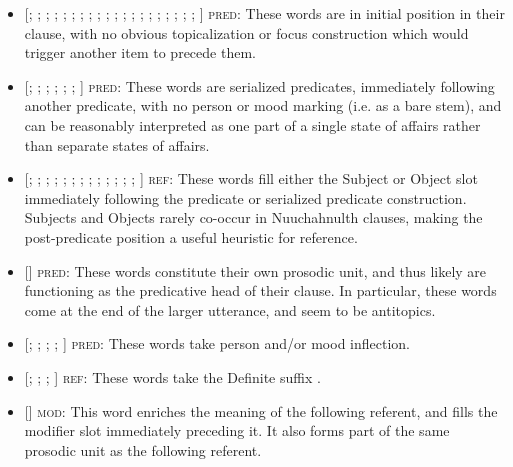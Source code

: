 \begin{itemize}
  \singlespacing
  \item {[; ; ; ; ; ; ; ; ; ; ; ; ; ; ; ; ; ; ; ; ]} \textsc{pred:} These words are in initial position in their clause, with no obvious topicalization or focus construction which would trigger another item to precede them.
  \item {[; ; ; ; ; ; ]} \textsc{pred:} These words are serialized predicates, immediately following another predicate, with no person or mood marking (i.e. as a bare stem), and can be reasonably interpreted as one part of a single state of affairs rather than separate states of affairs.
  \item {[; ; ; ; ; ; ; ; ; ; ; ; ; ]} \textsc{ref:} These words fill either the Subject or Object slot immediately following the predicate or serialized predicate construction. Subjects and Objects rarely co-occur in Nuuchahnulth clauses, making the post-predicate position a useful heuristic for reference.
  \item {[]} \textsc{pred:} These words constitute their own prosodic unit, and thus likely are functioning as the predicative head of their clause. In particular, these words come at the end of the larger utterance, and seem to be antitopics.
  \item {[; ; ; ; ]} \textsc{pred:} These words take person and/or mood inflection.
  \item {[; ; ; ]} \textsc{ref:} These words take the Definite suffix .
  \item {[]} \textsc{mod:} This word enriches the meaning of the following referent, and fills the modifier slot immediately preceding it. It also forms part of the same prosodic unit as the following referent.
\end{itemize}

